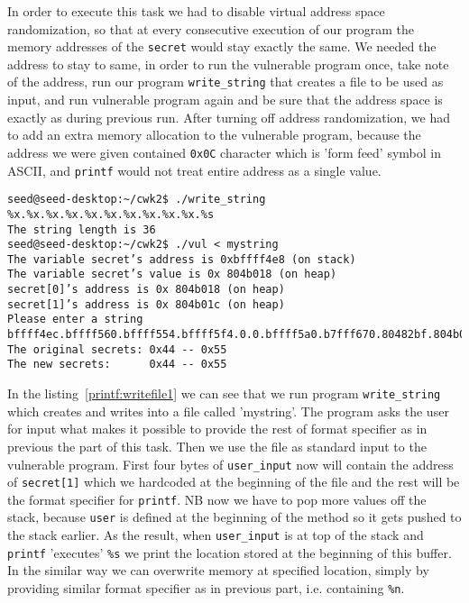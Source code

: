 \documentclass[12pt, a4paper, pdflatex]{article}
\begin{document}
In order to execute this task we had to disable virtual address space randomization, so that at every consecutive execution of our program the memory addresses of the \texttt{secret} would stay exactly the same. We needed the address to stay to same, in order to run the vulnerable program once, take note of the address, run our program \texttt{write\_string} that creates a file to be used as input, and run vulnerable program again and be sure that the address space is exactly as during previous run.
After turning off address randomization, we had to add an extra memory allocation to the vulnerable program, because the address we were given contained \texttt{0x0C} character which is 'form feed' symbol in ASCII, and \texttt{printf} would not treat entire address as a single value.

\vspace{1em}
\lstset{
	captionpos=b,
	frame=single,
	language=BASH,
	caption=Example of printing memory using a file as standard input,
	label=printf:writefile1,
	breaklines=true,
  float=tb
}
\begin{lstlisting}
seed@seed-desktop:~/cwk2$ ./write_string
%x.%x.%x.%x.%x.%x.%x.%x.%x.%x.%s
The string length is 36
seed@seed-desktop:~/cwk2$ ./vul < mystring
The variable secret’s address is 0xbffff4e8 (on stack)
The variable secret’s value is 0x 804b018 (on heap)
secret[0]’s address is 0x 804b018 (on heap)
secret[1]’s address is 0x 804b01c (on heap)
Please enter a string
bffff4ec.bffff560.bffff554.bffff5f4.0.0.bffff5a0.b7fff670.80482bf.804b018.U
The original secrets: 0x44 -- 0x55
The new secrets:      0x44 -- 0x55
\end{lstlisting}

In the listing~\ref{printf:writefile1} we can see that we run program \texttt{write\_string} which creates and writes into a file called 'mystring'. The program asks the user for input what makes it possible to provide the rest of format specifier as in previous the part of this task. Then we use the file as standard input to the vulnerable program. First four bytes of \texttt{user\_input} now will contain the address of \texttt{secret[1]} which we hardcoded at the beginning of the file and the rest will be the format specifier for \texttt{printf}. NB now we have to pop more values off the stack, because \texttt{user} is defined at the beginning of the method so it gets pushed to the stack earlier. As the result, when \texttt{user\_input} is at top of the stack and \texttt{printf} 'executes' \texttt{\%s} we print the location stored at the beginning of this buffer. In the similar way we can overwrite memory at specified location, simply by providing similar format specifier as in previous part, i.e. containing \texttt{\%n}.
\end{document}
